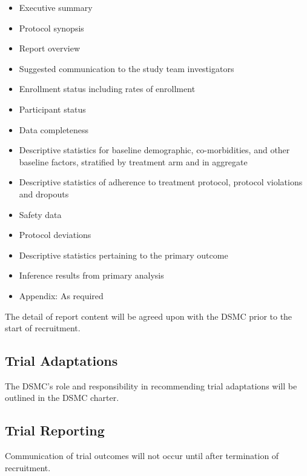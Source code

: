 \documentclass[11pt,parskip=half-]{scrartcl}
\providecommand{\tightlist}{%
  \setlength{\itemsep}{0pt}\setlength{\parskip}{0pt}}
\begin{document}
\begin{itemize}\tightlist
  \item
        Executive summary
  \item
        Protocol synopsis
  \item
        Report overview
  \item
        Suggested communication to the study team investigators
  \item
        Enrollment status including rates of enrollment
  \item
        Participant status
  \item
        Data completeness
  \item
        Descriptive statistics for baseline demographic, co-morbidities, and other baseline factors, stratified by treatment arm and in aggregate
  \item
        Descriptive statistics of adherence to treatment protocol, protocol violations and dropouts
  \item
        Safety data
  \item
        Protocol deviations
  \item
        Descriptive statistics pertaining to the primary outcome
  \item
        Inference results from primary analysis
  \item
        Appendix: As required
\end{itemize}

The detail of report content will be agreed upon with the DSMC prior to the start of recruitment.

\subsection{Trial Adaptations}\label{trial-adaptations}

The DSMC's role and responsibility in recommending trial adaptations will be outlined in the DSMC charter.

\subsection{Trial Reporting}\label{trial-reporting}

Communication of trial outcomes will not occur until after termination of recruitment.

\clearpage

\printbibliography[heading=bibintoc]

\clearpage
\end{document}
